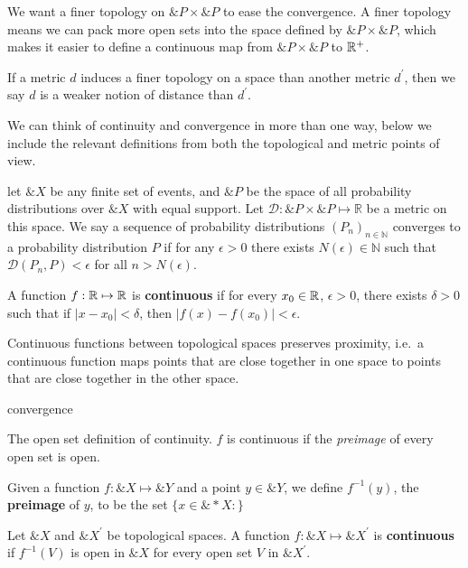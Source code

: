 We want a finer topology on $\&P \times \&P$ to ease the convergence.
A finer topology means we can pack more open sets into the space
defined by $\&P \times \&P$, which makes it easier to define a
continuous map from $\&P \times \&P$ to $\mathbb{R}^+$.

If a metric $d$ induces a finer topology on a space than another
metric $d^\prime$, then we say $d$ is a weaker notion of distance than
$d^\prime$.

We can think of continuity and convergence in more than one way, below
we include the relevant definitions from both the topological and
metric points of view.

\begin{definition}
  let $\&X$ be any finite set of events, and $\&P$ be the space of all
  probability distributions over $\&X$ with equal support. Let
  $\mathcal{D}: \&P \times \&P \mapsto \mathbb{R}$ be a metric on this
  space. We say a sequence of probability distributions
  $(P_n)_{n \in \mathbb{N}}$ converges to a probability distribution
  $P$ if for any $\epsilon > 0$ there exists
  $N(\epsilon) \in \mathbb{N}$ such that
  $\mathcal{D}(P_n,P) < \epsilon$ for all $n > N(\epsilon)$.
\end{definition}

\begin{definition}
  A function $f: \mathbb{R} \mapsto \mathbb{R}$ is \textbf{continuous} if for every
  $x_0 \in \mathbb{R}$, $\epsilon > 0$, there exists $\delta > 0$ such that if
  $|x - x_0| < \delta$, then $|f(x) - f(x_0)| < \epsilon$.
\end{definition}

Continuous functions between topological spaces preserves proximity,
i.e.\ a continuous function maps points that are close together in one
space to points that are close together in the other space.

\begin{definition}
  convergence
\end{definition}

The open set definition of continuity.  $f$ is continuous if the
\textit{preimage} of every open set is open.

\begin{definition}
  Given a function $f: \&X \mapsto \&Y$ and a point $y \in \&Y$, we
  define $f^{-1}(y)$, the \textbf{preimage} of $y$, to be the set $\{x
  \in \&*X : \}$
\end{definition}

\begin{definition}
  Let $\&X$ and $\&X^\prime$ be topological spaces.  A function
  $f: \&X \mapsto \&X^\prime$ is \textbf{continuous} if $f^{-1}(V)$ is
  open in $\&X$ for every open set $V$ in $\&X^\prime$.
\end{definition}

